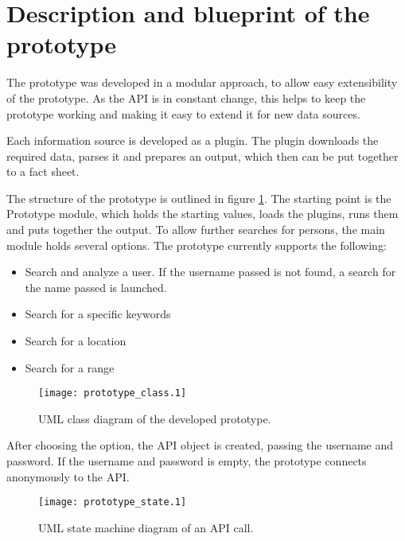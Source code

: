 \section{Description and blueprint of the prototype}

The prototype was developed in a modular approach, to allow easy extensibility
of the prototype. As the \Twitter{} API is in constant change, this helps to
keep the prototype working and making it easy to extend it for new data
sources.

Each information source is developed as a plugin. The plugin downloads the
required data, parses it and prepares an output, which then can be put together
to a fact sheet.

The structure of the prototype is outlined in figure \ref{fig:prototype_class}.
The starting point is the Prototype module, which holds the starting values,
loads the plugins, runs them and puts together the output. To allow further
searches for persons, the main module holds several options. The prototype
currently supports the following:

\begin{itemize}
  \item Search and analyze a user. If the username passed is not found, a
  search for the name passed is launched.
  \item Search for a specific keywords
  \item Search for a location
  \item Search for a range
\end{itemize}

\begin{figure}[ht]
  \begin{center}
    \texttt{[image: prototype\_class.1]}
    \label{fig:prototype_class}
    \caption{UML class diagram of the developed prototype.}
  \end{center}
\end{figure}

After choosing the option, the API object is created, passing the username and
password. If the username and password is empty, the prototype connects
anonymously to the \Twitter{} API.

\begin{figure}[ht]
  \begin{center}
    \texttt{[image: prototype\_state.1]}
    \label{fig:prototype_state}
    \caption{UML state machine diagram of an \Twitter{} API call.}
  \end{center}
\end{figure}

